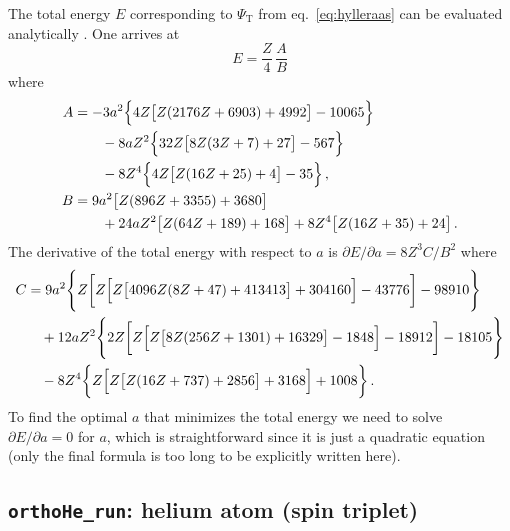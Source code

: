 \documentclass[12pt,a4paper,twoside]{article}
\def\code#1{{\lstinline$#1$}}
\begin{document}
The total energy $E$ corresponding to $\Psi_\text{T}$ from
eq.~\eqref{eq:hylleraas} can be evaluated analytically
\cite{hylleraas1929,schwartz2006}. One arrives at
\begin{equation}
E=\frac{Z}{4}\,\frac{A}{B}
\end{equation}
where
\begin{align}
A&=
  -3 a^2 \Bigl\{4 Z \bigl[Z (2176 Z+6903)+4992\bigr]-10065\Bigr\}\nonumber\\
 &\qquad -8 a Z^2 \Bigl\{32 Z \bigl[8 Z (3 Z+7)+27\bigr]-567\Bigr\}\nonumber\\
 &\qquad -8 Z^4\Bigl\{4 Z \bigl[Z (16 Z+25)+4\bigr]-35\Bigr\}\,,\\
B&= 9 a^2 \bigl[Z (896 Z+3355)+3680\bigr]\nonumber\\
 &\qquad +24 a Z^2\bigl[Z (64 Z+189)+168\bigr]
  +8Z^4 \bigl[Z (16 Z+35)+24\bigr]\,.
\end{align}
The derivative of the total energy with respect to $a$ is $\partial
E/\partial a=8 Z^3 C/B^2$ where
\begin{align}
C&=9 a^2 \Biggl\{Z \biggl[Z \Bigl[Z \bigl[4096 Z (8 Z+47)+413413\bigr]+304160\Bigr]-43776\biggr]-98910\Biggr\}\nonumber\\
&\quad +12 a Z^2 \Biggl\{2 Z \biggl[Z \Bigl[Z \bigl[8 Z (256 Z+1301)+16329\bigr]-1848\Bigr]-18912\biggr]-18105\Biggr\}\nonumber\\
&\quad -8 Z^4 \biggl\{Z \Bigl[Z \bigl[Z (16 Z+737)+2856\bigr]+3168\Bigr]+1008\biggr\}\,.
\end{align}
To find the optimal $a$ that minimizes the total energy we need to
solve $\partial E/\partial a=0$ for $a$, which is straightforward
since it is just a quadratic equation (only the final formula is too
long to be explicitly written here).



\subsection{\code{orthoHe_run}: helium atom (spin triplet)}
\end{document}
